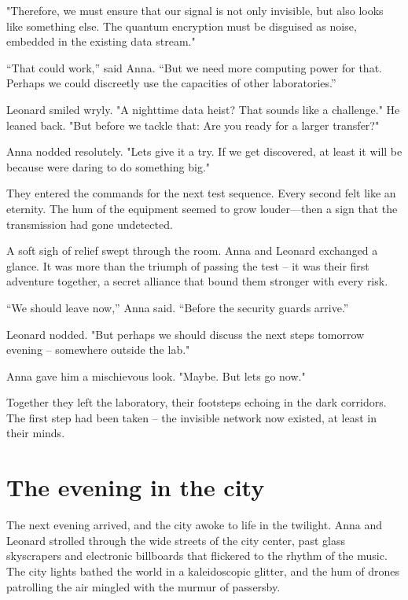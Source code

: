 \documentclass[
]{article}
\begin{document}
"Therefore, we must ensure that our signal is not only invisible, but also looks like something else. The quantum encryption must be disguised as noise, embedded in the existing data stream."

``That could work,'' said Anna. ``But we need more computing power for that. Perhaps we could discreetly use the capacities of other laboratories.''

Leonard smiled wryly. "A nighttime data heist? That sounds like a challenge." He leaned back. "But before we tackle that: Are you ready for a larger transfer?"

Anna nodded resolutely. "Let\textquotesingle s give it a try. If we get discovered, at least it will be because we\textquotesingle re daring to do something big."

They entered the commands for the next test sequence. Every second felt like an eternity. The hum of the equipment seemed to grow louder---then a sign that the transmission had gone undetected.

A soft sigh of relief swept through the room. Anna and Leonard exchanged a glance. It was more than the triumph of passing the test -- it was their first adventure together, a secret alliance that bound them stronger with every risk.

``We should leave now,'' Anna said. ``Before the security guards arrive.''

Leonard nodded. "But perhaps we should discuss the next steps tomorrow evening -- somewhere outside the lab."

Anna gave him a mischievous look. "Maybe. But let\textquotesingle s go now."

Together they left the laboratory, their footsteps echoing in the dark corridors. The first step had been taken -- the invisible network now existed, at least in their minds.

\section{The evening in the city}\label{the-evening-in-the-city}

The next evening arrived, and the city awoke to life in the twilight. Anna and Leonard strolled through the wide streets of the city center, past glass skyscrapers and electronic billboards that flickered to the rhythm of the music. The city lights bathed the world in a kaleidoscopic glitter, and the hum of drones patrolling the air mingled with the murmur of passersby.
\end{document}
